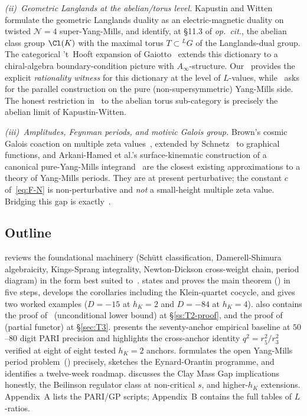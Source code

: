 \emph{(ii)~Geometric Langlands at the abelian/torus level.}
Kapustin and Witten~\cite{KapustinWitten2006} formulate the
geometric Langlands duality as an electric-magnetic duality on
twisted $\mathcal{N}=4$ super-Yang-Mills, and identify, at \S 11.3
of \emph{op.~cit.}, the abelian class group $\Cl(K)$ with the
maximal torus $T \subset {}^L\!G$ of the Langlands-dual group.
The categorical 't~Hooft expansion of Gaiotto~\cite{Gaiotto2025}
extends this dictionary to a chiral-algebra boundary-condition
picture with $A_\infty$-structure. Our~ provides the
explicit \emph{rationality witness} for this dictionary at the
level of $L$-values, while~ asks for the
parallel construction on the pure (non-supersymmetric) Yang-Mills
side. The honest restriction in~ to the abelian
torus sub-category is precisely the abelian limit of
Kapustin-Witten.

\emph{(iii)~Amplitudes, Feynman periods, and motivic Galois group.}
Brown's cosmic Galois coaction on multiple zeta
values~\cite{Brown2017}, extended by Schnetz~\cite{Schnetz2025}
to graphical functions, and Arkani-Hamed et al.'s
surface-kinematic construction of a canonical pure-Yang-Mills
integrand~\cite{ArkaniHamed2024} are the closest existing
approximations to a theory of Yang-Mills periods. They are at
present perturbative; the constant $c$ of~\eqref{eq:F-N} is
non-perturbative and \emph{not} a small-height multiple zeta
value. Bridging this gap is exactly~.

\subsection{Outline}\label{ss:outline}
 reviews the foundational machinery
(Sch\"utt classification, Damerell-Shimura algebraicity,
Kings-Sprang integrality, Newton-Dickson cross-weight chain,
period diagram) in the form best suited to~.
 states and proves the main theorem
() in five steps, develops the corollaries
including the Klein-quartet cocycle, and gives two worked
examples ($D = -15$ at $h_K = 2$ and $D = -84$ at $h_K = 4$).
 also contains the proof of~
(unconditional lower bound) at \S\ref{ss:T2-proof}, and the
proof of~ (partial functor) at
\S\ref{sec:T3}.  presents the seventy-anchor
empirical baseline at $50$--$80$ digit PARI precision and
highlights the cross-anchor identity $q^2 = r_5^2 / r_3^2$
verified at eight of eight tested $h_K = 2$ anchors.
 formulates the open Yang-Mills period
problem~() precisely, sketches the
Eynard-Orantin programme, and identifies a twelve-week roadmap.
 discusses the Clay Mass Gap implications
honestly, the Beilinson regulator class at non-critical $s$, and
higher-$h_K$ extensions. Appendix~A lists the PARI/GP scripts;
Appendix~B contains the full tables of $L$-ratios.

